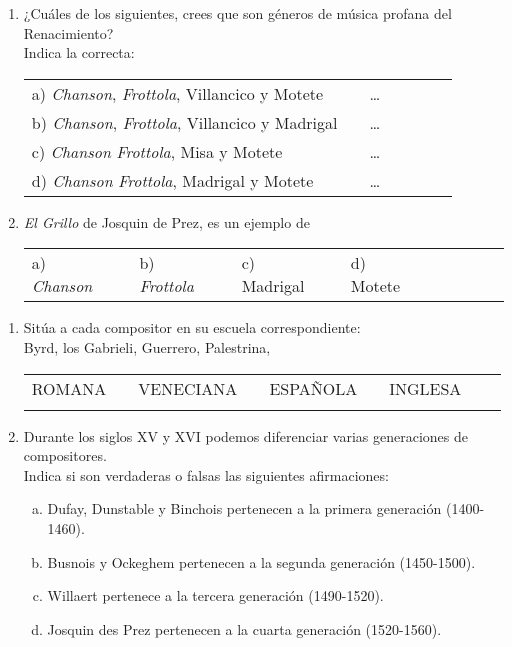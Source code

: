 \documentclass[letterpaper,12pt,notitlepage,spanish]{article}
\begin{document}
\begin{ejercicio}[]
	\begin{enumerate}[1.-]
%
%
		\item 
		¿Cuáles de los siguientes, crees que son géneros de música profana del Renacimiento?
		\\ Indica la correcta:\par		
		\begin{tabular}{l l l l l l l}
		a) \textit{Chanson}, \textit{Frottola}, Villancico y Motete & & \ldots\\
		b) \textit{Chanson}, \textit{Frottola}, Villancico y Madrigal & & \ldots\\
		c) \textit{Chanson} \textit{Frottola}, Misa y Motete & &  \ldots\\
		d) \textit{Chanson} \textit{Frottola}, Madrigal y Motete & & \ldots\\
		\end{tabular}
%
%
		\item 
		\textit{El Grillo} de Josquin de Prez, es un ejemplo de \par
		\begin{tabular}{l l l l l l l l l l l l}
		a) \textit{Chanson} & & 
		b) \textit{Frottola} & &
		c) Madrigal & &  
		d) Motete & &
		\end{tabular}
	\end{enumerate}
\end{ejercicio}
%
%
\begin{ejercicio}[]
	\begin{enumerate}[1.-]
%
%
		\item 
		Sitúa a cada compositor en su escuela correspondiente:\\
		Byrd, los Gabrieli, Guerrero, Palestrina, 
		\par
		\begin{tabular}{l l l l l l l l l}
		\small{ ROMANA} & & 
		\small{ VENECIANA} & & 
		\small{ ESPAÑOLA} & &  
		\small{ INGLESA} & & \\
		\dotfill & &
		\dotfill & &
		\dotfill & &
		\dotfill & &
		\end{tabular}
%
%
		\item 
		Durante los siglos XV y XVI podemos diferenciar varias generaciones de compositores. \\
		Indica si son verdaderas o falsas las siguientes afirmaciones:
		\begin{enumerate}[a)]
		\item Dufay, Dunstable y Binchois pertenecen a la primera generación (1400-1460). \dotfill
		\item Busnois y Ockeghem pertenecen a la segunda generación (1450-1500). \dotfill
		\item Willaert pertenece a la tercera generación (1490-1520). \dotfill
		\item Josquin des Prez pertenecen a la cuarta generación (1520-1560). \dotfill
		\end{enumerate}
	\end{enumerate}
\end{ejercicio}
\end{document}
